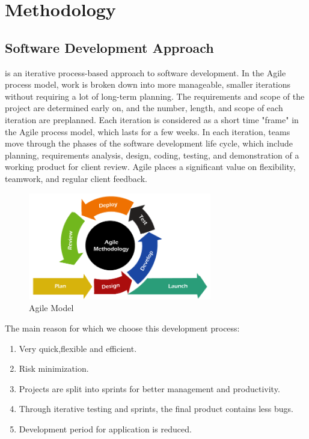 \chapter{Methodology}
\section{Software Development Approach}
 is an iterative process-based approach to software development. In the Agile process model, work is broken down into more manageable, smaller iterations without requiring a lot of long-term planning. The requirements and scope of the project are determined early on, and the number, length, and scope of each iteration are preplanned. Each iteration is considered as a short time "frame" in the Agile process model, which lasts for a few weeks. In each iteration, teams move through the phases of the software development life cycle, which include planning, requirements analysis, design, coding, testing, and demonstration of a working product for client review. Agile places a significant value on flexibility, teamwork, and regular client feedback.\\
\begin{figure}[H]
    \centering
    \includegraphics[width=80mm]{./img/agile.png}
    \caption{Agile Model}
\end{figure}
The main reason for which  we choose this development process:
\begin{enumerate}[noitemsep] %
\item Very quick,flexible and efficient.
\item Risk minimization.
\item Projects are split into sprints for better management and productivity.
\item Through iterative testing and sprints, the final product contains less bugs. 
\item Development period for application is reduced.
\end{enumerate}
